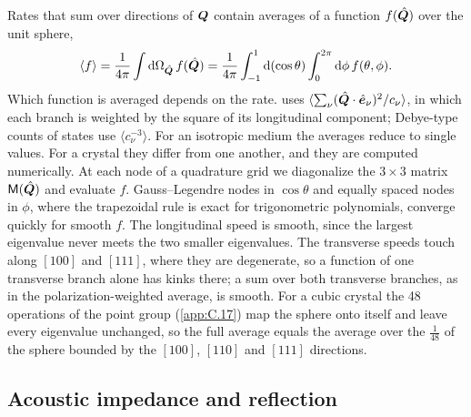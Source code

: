 Rates that sum over directions of $\bm{Q}$ contain averages of a function $f(\hat{\bm{Q}})$ over the unit sphere,
\begin{equation}
  \langle f\rangle = \frac{1}{4\pi}\int\mathrm{d}\Omega_{\hat{\bm{Q}}}\,f(\hat{\bm{Q}}) = \frac{1}{4\pi}\int_{-1}^{1}\mathrm{d}(\cos\theta)\int_0^{2\pi}\mathrm{d}\phi\,f(\theta,\phi) .
  \label{eq:C.18-average}
\end{equation}
Which function is averaged depends on the rate.  uses $\langle\sum_\nu(\hat{\bm{Q}}\cdot\hat{\bm{e}}_\nu)^2/c_\nu\rangle$, in which each branch is weighted by the square of its longitudinal component; Debye-type counts of states use $\langle c_\nu^{-3}\rangle$. For an isotropic medium the averages reduce to single values. For a crystal they differ from one another, and they are computed numerically. At each node of a quadrature grid we diagonalize the $3\times3$ matrix $\mathsf{M}(\hat{\bm{Q}})$ and evaluate $f$. Gauss--Legendre nodes in $\cos\theta$ and equally spaced nodes in $\phi$, where the trapezoidal rule is exact for trigonometric polynomials, converge quickly for smooth $f$. The longitudinal speed is smooth, since the largest eigenvalue never meets the two smaller eigenvalues. The transverse speeds touch along $[100]$ and $[111]$, where they are degenerate, so a function of one transverse branch alone has kinks there; a sum over both transverse branches, as in the polarization-weighted average, is smooth. For a cubic crystal the 48 operations of the point group (\cref{app:C.17}) map the sphere onto itself and leave every eigenvalue unchanged, so the full average equals the average over the $\tfrac1{48}$ of the sphere bounded by the $[100]$, $[110]$ and $[111]$ directions.

\subsection{Acoustic impedance and reflection}

